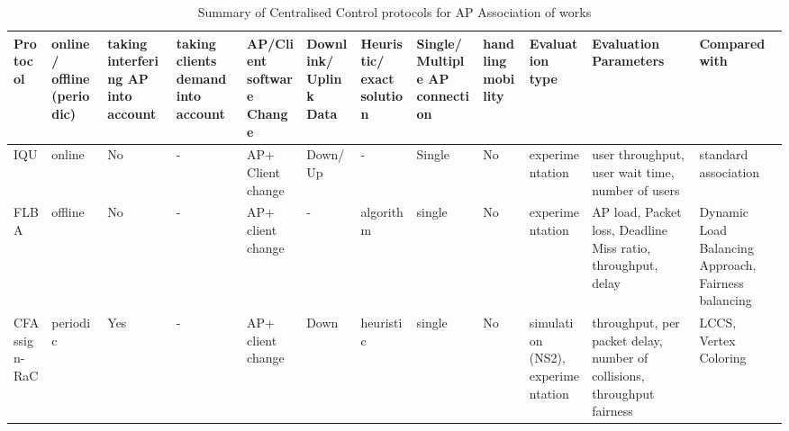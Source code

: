 \documentclass[journal,transmag]{IEEEtran}
\begin{document}
\begin{table}
\centering\caption{Summary of Centralised Control protocols for AP Association of works  \cite{06client_channel_WLAN,06practical_queue_based_AP_association,13sociality_aware_AP_slection,15fuzzy_load_balancing_802.11} \label{Tab:centralised_QOS_load_balancing}}
\begin{tabular} {|p{}|p{.9cm}|p{.9cm}|p{.6cm}|p{.95cm}|p{1.1cm}|p{.6cm}|p{}|p{}|p{} |p{2.3cm}|p{}|}
\hline
\cellcolor{xy}\scriptsize{Protocol} & \cellcolor{xy}\scriptsize{online/ offline (periodic)} & \cellcolor{xy}\scriptsize{taking interfering AP into account} & \cellcolor{xy}\scriptsize{taking clients demand into account} & \cellcolor{xy}\scriptsize{AP/Client software Change} & \cellcolor{xy} \scriptsize{Downlink/ Uplink Data} & \cellcolor{xy} \scriptsize{Heuristic/ exact solution} & \cellcolor{xy} \scriptsize{Single/Multiple AP connection} & \cellcolor{xy} \scriptsize{handling mobility} & \cellcolor{xy}\scriptsize{Evaluation type} & \cellcolor{xy}\scriptsize{Evaluation Parameters} & \cellcolor{xy}\scriptsize{Compared with} \\\hline\hline

\scriptsize{IQU \cite{06practical_queue_based_AP_association}} &\scriptsize{online} &\scriptsize{No} &\scriptsize{-} &\scriptsize{AP+ Client change} &\scriptsize{Down/ Up} &\scriptsize{-} &\scriptsize{Single}  &\scriptsize{No} &\scriptsize{experimentation} &\scriptsize{user throughput, user wait time, number of users} &\scriptsize{standard association} \\\hline

\scriptsize{FLBA \cite{15fuzzy_load_balancing_802.11}} &\scriptsize{offline} &\scriptsize{No} &\scriptsize{-} &\scriptsize{AP+ client change} &\scriptsize{-} &\scriptsize{algorithm} &\scriptsize{single} &\scriptsize{No} &\scriptsize{experimentation} &\scriptsize{AP load, Packet loss, Deadline Miss ratio, throughput, delay} &\scriptsize{Dynamic Load Balancing Approach, Fairness balancing \cite{04Fairness_load_balancing_WLAN}} \\\hline 

\scriptsize{CFAssign-RaC \cite{06client_channel_WLAN} } &\scriptsize{periodic} &\scriptsize{Yes} &\scriptsize{-} &\scriptsize{AP+ client change} &\scriptsize{Down} &\scriptsize{heuristic} &\scriptsize{single} &\scriptsize{No} &\scriptsize{simulation (NS2), experimentation} &\scriptsize{throughput, per packet delay, number of collisions, throughput fairness } &\scriptsize{LCCS, Vertex Coloring} \\\hline 


\end{tabular}
\end{table}
\end{document}

